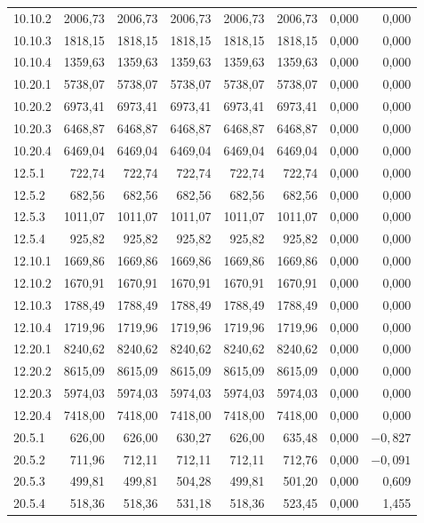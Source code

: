\documentclass[../DoAn.tex]{subfiles}
\begin{document}
\begin{small}
\begin{longtable}{l|r|rr|rr|rr}
10.10.2 & 2006,73 & 2006,73 & 2006,73 & 2006,73 & 2006,73 & 0,000 & 0,000 \\
10.10.3 & 1818,15 & 1818,15 & 1818,15 & 1818,15 & 1818,15 & 0,000 & 0,000 \\
10.10.4 & 1359,63 & 1359,63 & 1359,63 & 1359,63 & 1359,63 & 0,000 & 0,000 \\
10.20.1 & 5738,07 & 5738,07 & 5738,07 & 5738,07 & 5738,07 & 0,000 & 0,000 \\
10.20.2 & 6973,41 & 6973,41 & 6973,41 & 6973,41 & 6973,41 & 0,000 & 0,000 \\
10.20.3 & 6468,87 & 6468,87 & 6468,87 & 6468,87 & 6468,87 & 0,000 & 0,000 \\
10.20.4 & 6469,04 & 6469,04 & 6469,04 & 6469,04 & 6469,04 & 0,000 & 0,000 \\
12.5.1 & 722,74 & 722,74 & 722,74 & 722,74 & 722,74 & 0,000 & 0,000 \\
12.5.2 & 682,56 & 682,56 & 682,56 & 682,56 & 682,56 & 0,000 & 0,000 \\
12.5.3 & 1011,07 & 1011,07 & 1011,07 & 1011,07 & 1011,07 & 0,000 & 0,000 \\
12.5.4 & 925,82 & 925,82 & 925,82 & 925,82 & 925,82 & 0,000 & 0,000 \\
12.10.1 & 1669,86 & 1669,86 & 1669,86 & 1669,86 & 1669,86 & 0,000 & 0,000 \\
12.10.2 & 1670,91 & 1670,91 & 1670,91 & 1670,91 & 1670,91 & 0,000 & 0,000 \\
12.10.3 & 1788,49 & 1788,49 & 1788,49 & 1788,49 & 1788,49 & 0,000 & 0,000 \\
12.10.4 & 1719,96 & 1719,96 & 1719,96 & 1719,96 & 1719,96 & 0,000 & 0,000 \\
12.20.1 & 8240,62 & 8240,62 & 8240,62 & 8240,62 & 8240,62 & 0,000 & 0,000 \\
12.20.2 & 8615,09 & 8615,09 & 8615,09 & 8615,09 & 8615,09 & 0,000 & 0,000 \\
12.20.3 & 5974,03 & 5974,03 & 5974,03 & 5974,03 & 5974,03 & 0,000 & 0,000 \\
12.20.4 & 7418,00 & 7418,00 & 7418,00 & 7418,00 & 7418,00 & 0,000 & 0,000 \\
20.5.1 & 626,00 & 626,00 & 630,27 & 626,00 & 635,48 & 0,000 & $-0{,}827$ \\
20.5.2 & 711,96 & 712,11 & 712,11 & 712,11 & 712,76 & 0,000 & $-0{,}091$ \\
20.5.3 & 499,81 & 499,81 & 504,28 & 499,81 & 501,20 & 0,000 & 0,609 \\
20.5.4 & 518,36 & 518,36 & 531,18 & 518,36 & 523,45 & 0,000 & 1,455 \\

\end{longtable}
\end{small}
\end{document}
